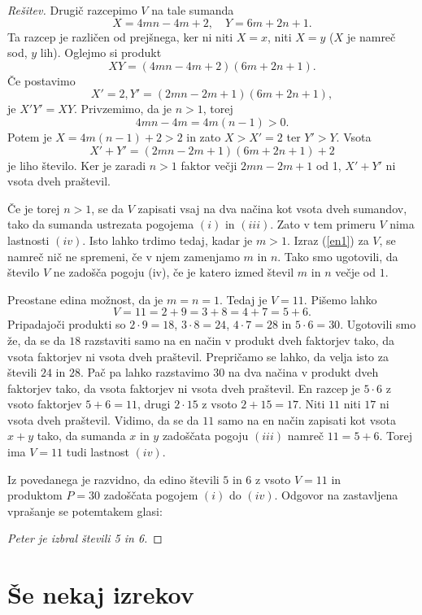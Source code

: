 \documentclass{amsart}
\begin{document}
\begin{proof}[Rešitev]
    Drugič razcepimo $V$ na tale sumanda $$X = 4mn - 4m +2, \quad Y= 6m+2n+1.$$ Ta razcep je različen od prejšnega, ker ni niti 
    $X = x$, niti $X = y$ ($X$ je namreč sod, $y$ lih). Oglejmo si produkt $$XY = (4mn - 4m +2)(6m+2n+1).$$ Če postavimo
    $$X' = 2, Y'=(2mn - 2m +1)(6m+2n+1),$$ je $X'Y' = XY$. Privzemimo, da je $n > 1$, torej$$4mn-4m=4m(n-1)>0.$$ Potem je 
    $X = 4m(n-1)+2 > 2$ in zato $X>X'=2$ ter $Y'>Y$. Vsota $$X'+Y' = (2mn - 2m +1)(6m+2n+1)+2$$ je liho število. Ker je zaradi 
    $n > 1$ faktor večji $2mn-2m+1$ od 1, $X'+Y'$ ni vsota dveh praštevil.

    Če je torej $n > 1$, se da $V$ zapisati vsaj na dva načina kot vsota dveh sumandov, tako da sumanda ustrezata pogojema $(i)$ 
    in $(iii)$. Zato v tem primeru $V$ nima lastnosti $(iv)$. Isto lahko trdimo tedaj, kadar je $m>1$. Izraz (\ref{en1}) za $V$, se 
    namreč nič ne spremeni, če v njem zamenjamo $m$ in $n$. Tako smo ugotovili, da število $V$ ne zadošča pogoju (iv), če je 
    katero izmed števil $m$ in $n$ večje od $1$.

    Preostane edina možnost, da je $m = n = 1$. Tedaj je $V = 11$. Pišemo lahko $$V = 11 = 2 + 9 = 3 + 8 = 4 + 7 = 5 + 6.$$ 
    Pripadajoči produkti so $2\cdot 9 = 18$, $3 \cdot 8 = 24$, $4\cdot 7 = 28$ in $5\cdot 6 = 30$. Ugotovili smo že,
    da se da $18$ razstaviti samo na en način v produkt dveh faktorjev tako, da vsota faktorjev ni vsota dveh praštevil. Prepričamo
    se lahko, da velja isto za števili $24$ in $28$. Pač pa lahko razstavimo $30$ na dva načina v produkt dveh faktorjev tako, 
    da vsota faktorjev ni vsota dveh praštevil. En razcep je $5\cdot 6$ z vsoto faktorjev $5 + 6 = 11$, drugi $2\cdot 15$ z 
    vsoto $2 + 15 = 17$. Niti $11$ niti $17$ ni vsota dveh praštevil. Vidimo, da se da $11$ samo na en način zapisati kot vsota 
    $x + y$ tako, da sumanda $x$ in $y$ zadoščata pogoju $(iii)$ namreč $11 = 5 + 6$. Torej ima $V = 11$ tudi lastnost $(iv)$. 

    Iz povedanega je razvidno, da edino števili $5$ in $6$ z vsoto $V = 11$ in \\produktom $P = 30$ zadoščata pogojem $(i)$ do $(iv)$.
    Odgovor na zastavljena vprašanje se potemtakem glasi:

    \emph{Peter je izbral števili 5 in 6.}
\end{proof}

\newpage
\section{Še nekaj izrekov}
\end{document}
